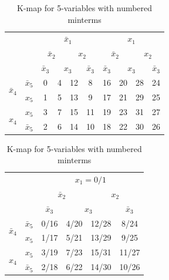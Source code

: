 \documentclass[twocolumn]{article}
\newcommand{\bx}{\bar{x}}
\begin{document}
\begin{table}
  \begin{tabular}{c|c|c|c|c|c|c|c|c|c}
  \toprule
  && \multicolumn{4}{c|}{$\bx_1$} & \multicolumn{4}{c}{$x_1$}
    \\
    && \multicolumn{2}{c|}{$\bx_2$} & \multicolumn{2}{c|}{$x_2$}
               & \multicolumn{2}{c|}{$\bx_2$} & \multicolumn{2}{c}{$x_2$}
  \\
  && $\bx_3$ & \multicolumn{2}{c|}{$x_3$} & $\bx_3$
              & $\bx_3$ & \multicolumn{2}{c|}{$x_3$} & $\bx_3$
  \\ \midrule
  \multirow{2}{*}{$\bx_4$} & $\bx_5$
                                  & 0 & 4 & 12 & 8
                                              & 16 & 20 &  28 & 24
  \\
  & $x_5$
                                  & 1 & 5 & 13 & 9
                                              & 17 & 21 &  29 & 25
  \\
  \multirow{2}{*}{$x_4$}   &  $x_5$
                                  & 3 & 7 & 15 & 11
                                              & 19 & 23 &  31 & 27
  \\
  & $\bx_5$
                                  & 2 & 6 & 14 & 10
                                              & 18 & 22 &  30 & 26
  \\\bottomrule
\end{tabular}
\hfill
\begin{tabular}{c|c|cccc}
  \toprule
  && \multicolumn{4}{c}{$x_1 = 0/1$}
  \\
  && \multicolumn{2}{c|}{$\bx_2$} & \multicolumn{2}{c}{$x_2$}
                                    
  \\
  && $\bx_3$ & \multicolumn{2}{|c|}{$x_3$} & $\bx_3$
  \\ \midrule
  \multirow{2}{*}{$\bx_4$} & $\bx_5$
  &
    0/16 & 4/20 &  12/28 & 8/24
  \\
  & $x_5$
  &
    1/17 & 5/21  & 13/29 & 9/25
  \\
  \multirow{2}{*}{$x_4$}   &  $x_5$
  &
    3/19 & 7/23 &  15/31 & 11/27
  \\
  & $\bx_5$
  &
    2/18 & 6/22 & 14/30 & 10/26
  \\\bottomrule
\end{tabular}
\caption{K-map for 5-variables with numbered minterms}
\end{table}
\end{document}
